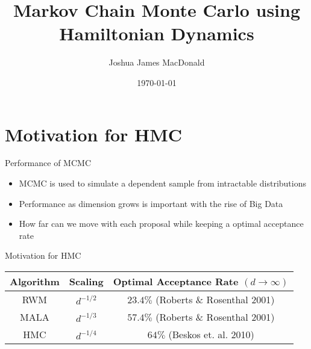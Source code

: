 \documentclass{beamer}
\title[MCMC using Hamiltonian Dynamics]{Markov Chain Monte Carlo using Hamiltonian Dynamics}
\author{Joshua James MacDonald}
\institute{}
\date{\today}
\begin{document}

\begin{frame}
  \titlepage
\end{frame}



\section{Motivation for HMC}


\begin{frame}{Performance of MCMC}

\begin{itemize}
\item MCMC is used to simulate a dependent sample from intractable distributions

\item Performance as dimension grows is important with the rise of Big Data

\item How far can we move with each proposal while keeping a optimal acceptance rate

\end{itemize}

\end{frame}


\begin{frame}{Motivation for HMC}

\begin{table}
\centering
\begin{tabular}{|c||c|c|}
\hline
Algorithm & Scaling & Optimal Acceptance Rate $(d \to \infty)$ \\
\hline
RWM & $d^{-1/2}$ & $23.4\%$ (Roberts \& Rosenthal 2001) \\
MALA & $d^{-1/3}$ & $57.4\%$ (Roberts \& Rosenthal 2001) \\
HMC & $d^{-1/4}$ & $64\%$ (Beskos et. al. 2010) \\
\hline
\end{tabular}
\end{table}

\end{frame}
\end{document}
